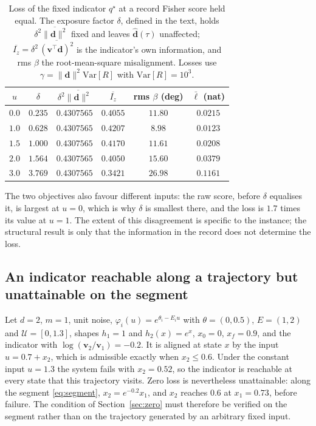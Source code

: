 \documentclass[12pt]{article}
\newcommand{\dvec}{\mathbf{d}}
\newcommand{\dhat}{\hat{\mathbf{d}}}
\newcommand{\Var}{\mathrm{Var}}
\newcommand{\lloss}{\ell}
\begin{document}
\begin{table}[tb]
\caption{Loss of the fixed indicator $q^{\star}$ at a record Fisher score held equal. The exposure factor $\delta$, defined in the text, holds $\delta^{2}\overline{\|\dvec\|^{2}}$ fixed and leaves $\dhat(\tau)$ unaffected; $\overline{I_z}=\delta^{2}\,\overline{(\mathbf v^{\top}\dvec)^{2}}$ is the indicator's own information, and rms $\beta$ the root-mean-square misalignment. Losses use $\gamma=\|\dvec\|^{2}\Var[R]$ with $\Var[R]=10^{3}$.}
\label{tab:levelset}
\centering
\begin{tabular}{cccccc}
\hline
$u$ & $\delta$ & $\delta^{2}\overline{\|\dvec\|^{2}}$ & $\overline{I_z}$
& rms $\beta$ (deg) & $\bar{\lloss}$ (nat)\\
\hline
$0.0$ & $0.235$ & $0.4307565$ & $0.4055$ & $11.80$ & $0.0215$\\
$1.0$ & $0.628$ & $0.4307565$ & $0.4207$ & $8.98$ & $0.0123$\\
$1.5$ & $1.000$ & $0.4307565$ & $0.4170$ & $11.61$ & $0.0208$\\
$2.0$ & $1.564$ & $0.4307565$ & $0.4050$ & $15.60$ & $0.0379$\\
$3.0$ & $3.769$ & $0.4307565$ & $0.3421$ & $26.98$ & $0.1161$\\
\hline
\end{tabular}
\end{table}

The two objectives also favour different inputs: the raw score, before
$\delta$ equalises it, is largest at $u=0$, which is why $\delta$ is smallest
there, and the loss is $1.7$ times its value at $u=1$. The extent of this
disagreement is specific to the instance; the structural result is only that
the information in the record does not determine the loss.

\subsection{An indicator reachable along a trajectory but unattainable on the segment}
\label{sec:counter}

Let $d=2$, $m=1$, unit noise, $\varphi_i(u)=e^{\theta_i-E_iu}$ with
$\theta=(0,0.5)$, $E=(1,2)$ and $\mathcal U=[0,1.3]$, shapes $h_1=1$ and
$h_2(x)=e^{x}$, $x_0=0$, $x_f=0.9$, and the indicator with
$\log(\mathbf v_2/\mathbf v_1)=-0.2$. It is aligned at state $x$ by the input
$u=0.7+x_2$, which is admissible exactly when $x_2\le0.6$. Under the constant
input $u=1.3$ the system fails with $x_2=0.52$, so the indicator is reachable at
every state that this trajectory visits. Zero loss is nevertheless
unattainable: along the segment \eqref{eq:segment}, $x_2=e^{-0.2}x_1$, and $x_2$ reaches $0.6$ at
$x_1=0.73$, before failure. The condition of Section~\ref{sec:zero} must
therefore be verified on the segment rather than on the trajectory generated
by an arbitrary fixed input.
\end{document}
